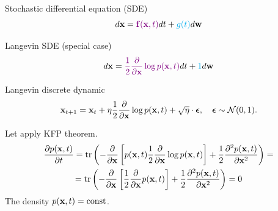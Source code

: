 \begin{frame}{Stochastic differential equation (SDE)}
	\[
		d\mathbf{x} = {\color{violet}\mathbf{f}(\mathbf{x}, t)} dt + {\color{cyan}g(t)} d \mathbf{w}
	\]
	\vspace{-0.4cm}
	\begin{block}{Langevin SDE (special case)}
		\vspace{-0.3cm}
		\[
			d \mathbf{x} = {\color{violet}\frac{1}{2} \frac{\partial}{\partial \mathbf{x}} \log p(\mathbf{x}, t)} d t + {\color{cyan} 1 }d \mathbf{w}
		\]
		\vspace{-0.6cm}
	\end{block}
	\begin{block}{Langevin discrete dynamic}
		\vspace{-0.3cm}
		\[
			\mathbf{x}_{t + 1} = \mathbf{x}_t + \eta \frac{1}{2} \frac{\partial}{\partial \mathbf{x}} \log p(\mathbf{x}, t) + \sqrt{\eta} \cdot \boldsymbol{\epsilon}, \quad \boldsymbol{\epsilon} \sim \mathcal{N}(0, 1).
		\]
		\vspace{-0.3cm}
	\end{block}
	Let apply KFP theorem.
	\begin{multline*}
		\frac{\partial p(\mathbf{x}, t)}{\partial t} =  \text{tr} \left(- \frac{\partial}{\partial \mathbf{x}}\left[ p(\mathbf{x}, t) \frac{1}{2} \frac{\partial}{\partial \mathbf{x}} \log p(\mathbf{x}, t) \right]  + \frac{1}{2} \frac{\partial^2 p(\mathbf{x}, t)}{\partial \mathbf{x}^2} \right) = \\
		= \text{tr} \left(- \frac{\partial}{\partial \mathbf{x}}\left[ \frac{1}{2} \frac{\partial}{\partial \mathbf{x}} p(\mathbf{x}, t) \right]  + \frac{1}{2} \frac{\partial^2 p(\mathbf{x}, t)}{\partial \mathbf{x}^2} \right) = 0
	\end{multline*}
	The density $p(\mathbf{x}, t) = \text{const}$.
\end{frame}
